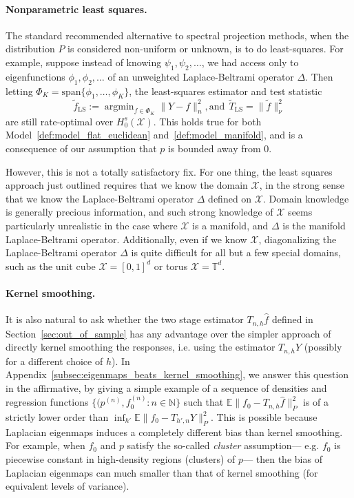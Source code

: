 \documentclass{article}
\newcommand{\1}{\mathbf{1}}
\DeclareMathOperator*{\argmin}{argmin}
\newcommand{\mc}[1]{\mathcal{#1}}
\newcommand{\Ebb}{\mathbb{E}}
\newcommand{\wt}[1]{\widetilde{#1}}
\newcommand{\wh}[1]{\widehat{#1}}
\theoremstyle{alden}
\theoremstyle{aldenthm}
\theoremstyle{definition}
\theoremstyle{remark}
\begin{document}
\paragraph{Nonparametric least squares.}
The standard recommended alternative to spectral projection methods, when the distribution $P$ is considered non-uniform or unknown, is to do least-squares. For example, suppose instead of knowing $\psi_1,\psi_2,\ldots$, we had access only to eigenfunctions $\phi_1,\phi_2,\ldots$ of an unweighted Laplace-Beltrami operator $\Delta$. Then letting $\Phi_K = \mathrm{span}\{\phi_1,\ldots,\phi_K\}$, the least-squares estimator and test statistic
\begin{equation*}
\wt{f}_{\mathrm{LS}} := \argmin_{f \in \Phi_K} \|Y - f\|_n^2,\textrm{and}~~\wt{T}_{\mathrm{LS}} = \|\wt{f}\|_{\nu}^2
\end{equation*}
are still rate-optimal over $H_0^s(\mc{X})$. This holds true for both Model~\ref{def:model_flat_euclidean} and~\ref{def:model_manifold}, and is a consequence of our assumption that $p$ is bounded away from $0$.

However, this is not a totally satisfactory fix. For one thing, the least squares approach just outlined requires that we know the domain $\mc{X}$, in the strong sense that we know the Laplace-Beltrami operator $\Delta$ defined on $\mc{X}$. Domain knowledge is generally precious information, and such strong knowledge of $\mc{X}$ seems particularly unrealistic in the case where $\mc{X}$ is a manifold, and $\Delta$ is the manifold Laplace-Beltrami operator. Additionally, even if we know $\mc{X}$, diagonalizing the Laplace-Beltrami operator $\Delta$ is quite difficult for all but a few special domains, such as the unit cube $\mc{X} = [0,1]^d$ or torus $\mc{X} = \mathbb{T}^d$.


\paragraph{Kernel smoothing.}
It is also natural to ask whether the two stage estimator $T_{n,h}\wh{f}$ defined in Section~\ref{sec:out_of_sample} has any advantage over the simpler approach of directly kernel smoothing the responses, i.e. using the estimator $T_{n,h}Y$ (possibly for a different choice of $h$). In Appendix~\ref{subsec:eigenmaps_beats_kernel_smoothing}, we answer this question in the affirmative, by giving a simple example of a sequence of densities and regression functions $\{(p^{(n)}, f_0^{(n)}: n \in \mathbb{N}\}$ such that $\Ebb\|f_0 - T_{n,h}\wh{f}\|_P^2$ is of a strictly lower order than $\inf_{h'} \Ebb\|f_0 - T_{h',n}Y\|_P^2$. This is possible because Laplacian eigenmaps induces a completely different bias than kernel smoothing. For example, when $f_0$ and $p$ satisfy the so-called \emph{cluster} assumption--- e.g. $f_0$ is piecewise constant in high-density regions (clusters) of $p$--- then the bias of Laplacian eigenmaps can much smaller than that of kernel smoothing (for equivalent levels of variance). 
\end{document}

